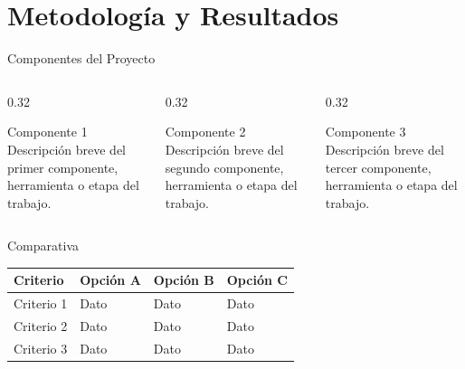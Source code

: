 
\section{Metodología y Resultados}

\begin{frame}{Componentes del Proyecto}
  \begin{columns}[T]
    \begin{column}{0.32\textwidth}
      \begin{block}{Componente 1}
        Descripción breve del primer componente, herramienta o etapa del trabajo.
      \end{block}
    \end{column}
    \begin{column}{0.32\textwidth}
      \begin{block}{Componente 2}
        Descripción breve del segundo componente, herramienta o etapa del trabajo.
      \end{block}
    \end{column}
    \begin{column}{0.32\textwidth}
      \begin{block}{Componente 3}
        Descripción breve del tercer componente, herramienta o etapa del trabajo.
      \end{block}
    \end{column}
  \end{columns}
\end{frame}

\begin{frame}{Comparativa}
  \begin{table}
    \centering
    \small
    \begin{tabularx}{\textwidth}{@{} l X X X @{}}
      \toprule
      \textbf{Criterio} & \textbf{Opción A} & \textbf{Opción B} & \textbf{Opción C} \\
      \midrule
      Criterio 1  & Dato & Dato & Dato \\
      Criterio 2  & Dato & Dato & Dato \\
      Criterio 3  & Dato & Dato & Dato \\
      \bottomrule
    \end{tabularx}
  \end{table}
\end{frame}

